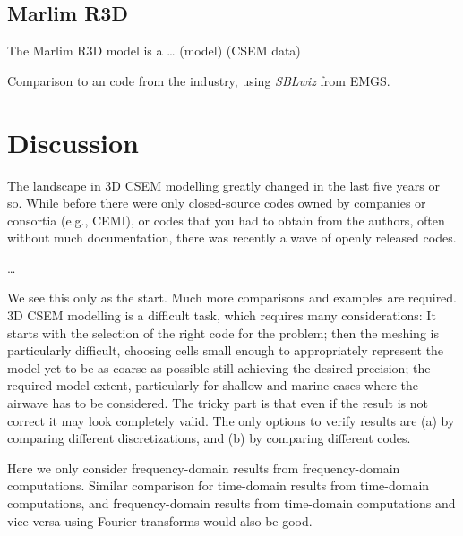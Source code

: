 \documentclass[
    paper,
  ]{geophysics}
\begin{document}
%
%

%
%

%
%


\subsection{Marlim R3D}

The Marlim R3D model is a \dots \cite{BJG.17.Carvalho} (model)
\cite{GEO.19.Correa} (CSEM data)

Comparison to an code from the industry, using \emph{SBLwiz} from EMGS.



\section{Discussion}

The landscape in 3D CSEM modelling greatly changed in the last five years or
so. While before there were only closed-source codes owned by companies or
consortia (e.g., CEMI), or codes that you had to obtain from the authors, often
without much documentation, there was recently a wave of openly released codes.

\dots

We see this only as the start. Much more comparisons and examples are required.
3D CSEM modelling is a difficult task, which requires many considerations: It
starts with the selection of the right code for the problem; then the meshing
is particularly difficult, choosing cells small enough to appropriately
represent the model yet to be as coarse as possible still achieving the desired
precision; the required model extent, particularly for shallow and marine cases
where the airwave has to be considered. The tricky part is that even if the
result is not correct it may look completely valid. The only options to verify
results are (a) by comparing different discretizations, and (b) by comparing
different codes.

Here we only consider frequency-domain results from frequency-domain
computations. Similar comparison for time-domain results from time-domain
computations, and frequency-domain results from time-domain computations and
vice versa using Fourier transforms would also be good.
\end{document}
